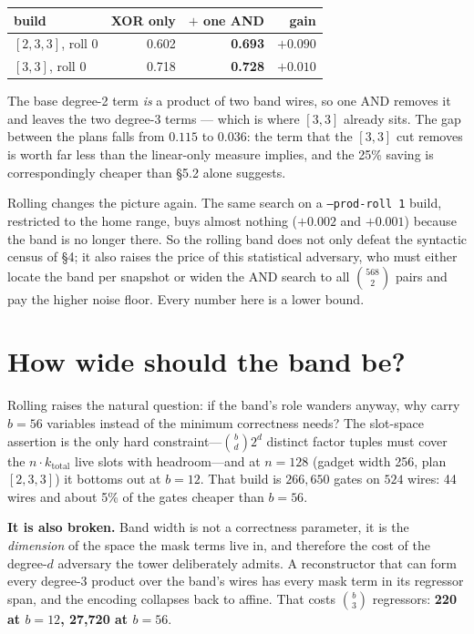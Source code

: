 \documentclass[11pt]{article}
\begin{document}
\begin{center}
\begin{tabular}{lrrr}
\toprule
build & XOR only & $+$ one AND & gain \\
\midrule
$[2,3,3]$, roll 0 & 0.602 & \textbf{0.693} & $+0.090$ \\
$[3,3]$, roll 0 & 0.718 & \textbf{0.728} & $+0.010$ \\
\bottomrule
\end{tabular}
\end{center}

The base degree-2 term \emph{is} a product of two band wires, so one AND removes
it and leaves the two degree-3 terms --- which is where $[3,3]$ already sits.
The gap between the plans falls from $0.115$ to $0.036$: the term that the
$[3,3]$ cut removes is worth far less than the linear-only measure implies, and
the 25\% saving is correspondingly cheaper than \S5.2 alone suggests.

Rolling changes the picture again. The same search on a \texttt{--prod-roll 1}
build, restricted to the home range, buys almost nothing ($+0.002$ and $+0.001$)
because the band is no longer there. So the rolling band does not only defeat
the syntactic census of \S4; it also raises the price of this statistical
adversary, who must either locate the band per snapshot or widen the AND search
to all $\binom{568}{2}$ pairs and pay the higher noise floor. Every number here
is a lower bound.

\section{How wide should the band be?}

Rolling raises the natural question: if the band's role wanders anyway, why
carry $b=56$ variables instead of the minimum correctness needs? The slot-space
assertion is the only hard constraint---$\binom{b}{d}2^{d}$ distinct factor
tuples must cover the $n\cdot k_{\mathrm{total}}$ live slots with headroom---and
at $n{=}128$ (gadget width 256, plan $[2,3,3]$) it bottoms out at $b=12$. That
build is $266{,}650$ gates on $524$ wires: 44 wires and about 5\% of the gates
cheaper than $b=56$.

\textbf{It is also broken.} Band width is not a correctness parameter, it is
the \emph{dimension} of the space the mask terms live in, and therefore the
cost of the degree-$d$ adversary the tower deliberately admits. A reconstructor
that can form every degree-3 product over the band's wires has every mask term
in its regressor span, and the encoding collapses back to affine. That costs
$\binom{b}{3}$ regressors: \textbf{220 at $b{=}12$, 27{,}720 at $b{=}56$}.
\end{document}
